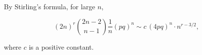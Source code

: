 By Stirling's formula, for large $n$,

$$(2n)^r \binom{2n-2}{n-1} \frac{1}{n} (pq)^n \sim c \, (4pq)^n \cdot n^{r-3/2},$$

where $c$ is a positive constant.
